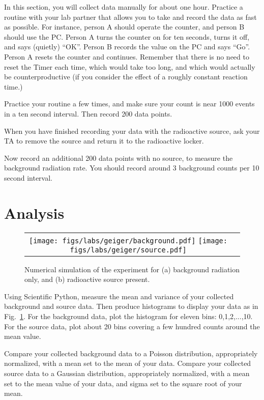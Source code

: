In this section, you will collect data manually for about one hour.
Practice a routine with your lab partner that allows you to take and
record the data as fast as possible.  For instance, person A should
operate the counter, and person B should use the PC.  Person A turns
the counter on for ten seconds, turns it off, and says (quietly)
``OK''.  Person B records the value on the PC and says ``Go''.  Person
A resets the counter and continues.  Remember that there is no need to
reset the Timer each time, which would take too long, and which would
actually be counterproductive (if you consider the effect of a roughly
constant reaction time.) 

Practice your routine a few times, and make sure your count is near 1000 events in
a ten second interval.  Then record 200 data points.

When you have finished recording your data with the radioactive
source, ask your TA to remove the source and return it to the
radioactive locker.

Now record an additional 200 data points with no source, to measure
the background radiation rate.  You should record around 3 background
counts per 10 second interval.

\section{Analysis}

\begin{figure}[htbp]
\begin{center}
\begin{tabular}{cc}
\texttt{[image: figs/labs/geiger/background.pdf]}
\texttt{[image: figs/labs/geiger/source.pdf]}
\end{tabular}
\end{center}
\caption{\label{fig:geigeranalysis} Numerical simulation of the experiment
  for (a) background radiation only, and (b) radioactive source
  present.}
\end{figure}

Using Scientific Python, measure the mean and variance of your
collected background and source data.  Then produce histograms to
display your data as in Fig.~\ref{fig:geigeranalysis}.  For the
background data, plot the histogram for eleven bins: 0,1,2,...,10.
For the source data, plot about 20 bins covering a few hundred counts
around the mean value.

Compare your collected background data to a Poisson distribution,
appropriately normalized, with a mean set to the mean of your data.
Compare your collected source data to a Gaussian distribution,
appropriately normalized, with a mean set to the mean value of your
data, and sigma set to the square root of your mean.










